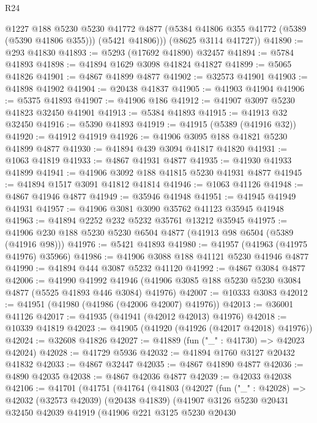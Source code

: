 \begin{lexlean}{R24}
\begin{coremodule}
          @1227
          @188
          @5230
          @5230
          @41772
          @4877
          (@5384 @41806 @355 @41772 (@5389 (@5390 @41806 @355)))
          (@5421 @41806)))
      (@8625 @3114 @41727))
@41890 := @293 @41830
@41893 := @5293 (@17692 @41890) @32457
@41894 := @5784 @41893
@41898 := @41894 @1629 @3098 @41824 @41827
@41899 := @5065 @41826
@41901 := @4867 @41899 @4877
@41902 := @32573 @41901
@41903 := @41898 @41902
@41904 := @20438 @41837
@41905 := @41903 @41904
@41906 := @5375 @41893
@41907 := @41906 @186
@41912 := @41907 @3097 @5230 @41823 @32450 @41901
@41913 := @5384 @41893
@41915 := @41913 @32 @32450
@41916 := @5390 @41893
@41919 := @41915 (@5389 (@41916 @32))
@41920 := @41912 @41919
@41926 := @41906 @3095 @188 @41821 @5230 @41899 @4877
@41930 := @41894 @439 @3094 @41817 @41820
@41931 := @1063 @41819
@41933 := @4867 @41931 @4877
@41935 := @41930 @41933 @41899
@41941 := @41906 @3092 @188 @41815 @5230 @41931 @4877
@41945 := @41894 @1517 @3091 @41812 @41814
@41946 := @1063 @41126
@41948 := @4867 @41946 @4877
@41949 := @35946 @41948
@41951 := @41945 @41949 @41931
@41957 := @41906 @3081 @3090 @35762 @41123 @35945 @41948
@41963 := @41894 @2252 @232 @5232 @35761 @13212 @35945
@41975 := @41906 @230 @188 @5230 @5230 @6504 @4877 (@41913 @98 @6504 (@5389 (@41916 @98)))
@41976 := @5421 @41893
@41980 := @41957 (@41963 (@41975 @41976) @35966)
@41986 := @41906 @3088 @188 @41121 @5230 @41946 @4877
@41990 := @41894 @444 @3087 @5232 @41120
@41992 := @4867 @3084 @4877
@42006 := @41990
    @41992
    @41946
    (@41906 @3085 @188 @5230 @5230 @3084 @4877 (@5525 @41893 @446 @3084) @41976)
@42007 := @10333 @3083
@42012 := @41951 (@41980 (@41986 (@42006 @42007) @41976))
@42013 := @36001 @41126
@42017 := @41935 (@41941 (@42012 @42013) @41976)
@42018 := @10339 @41819
@42023 := @41905 (@41920 (@41926 (@42017 @42018) @41976))
@42024 := @32608 @41826
@42027 := @41889 (fun ("_" : @41730) => @42023 @42024)
@42028 := @41729 @5936
@42032 := @41894 @1760 @3127 @20432 @41832
@42033 := @4867 @32447
@42035 := @4867 @41890 @4877
@42036 := @4890 @42035
@42038 := @4867 @42036 @4877
@42039 := @42033 @42038
@42106 := @41701
    (@41751
      (@41764
        (@41803
          (@42027
            (fun ("_" : @42028) =>
            @42032
              (@32573 @42039)
              (@20438 @41839)
              (@41907
                @3126
                @5230
                @20431
                @32450
                @42039
                @41919
                (@41906
                  @221
                  @3125
                  @5230
                  @20430

\end{coremodule}
\end{lexlean}
